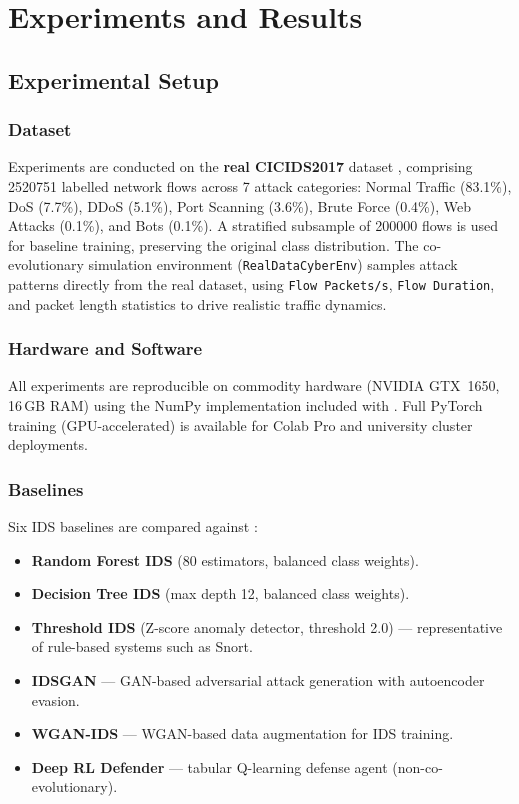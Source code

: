 \chapter{Experiments and Results}
\label{ch:experiments}

\section{Experimental Setup}

\subsection{Dataset}
Experiments are conducted on the \textbf{real CICIDS2017} dataset
\citep{sharafaldin2018}, comprising \num{2520751} labelled network flows
across 7 attack categories: Normal Traffic (83.1\%), DoS (7.7\%),
DDoS (5.1\%), Port Scanning (3.6\%), Brute Force (0.4\%),
Web Attacks (0.1\%), and Bots (0.1\%).
A stratified subsample of \num{200000} flows is used for baseline
training, preserving the original class distribution.
The co-evolutionary simulation environment (\texttt{RealDataCyberEnv})
samples attack patterns directly from the real dataset, using
\texttt{Flow Packets/s}, \texttt{Flow Duration}, and packet length
statistics to drive realistic traffic dynamics.

\subsection{Hardware and Software}
All experiments are reproducible on commodity hardware
(NVIDIA GTX~1650, 16\,GB RAM) using the NumPy implementation
included with \caesar{}.
Full PyTorch training (GPU-accelerated) is available for Colab Pro
and university cluster deployments.

\subsection{Baselines}
Six IDS baselines are compared against \caesar{}:
\begin{itemize}
  \item \textbf{Random Forest IDS} (80 estimators, balanced class weights).
  \item \textbf{Decision Tree IDS} (max depth 12, balanced class weights).
  \item \textbf{Threshold IDS} (Z-score anomaly detector, threshold 2.0) ---
    representative of rule-based systems such as Snort.
  \item \textbf{IDSGAN} \citep{lin2018} --- GAN-based adversarial attack
    generation with autoencoder evasion.
  \item \textbf{WGAN-IDS} \citep{ring2019} --- WGAN-based data augmentation
    for IDS training.
  \item \textbf{Deep RL Defender} \citep{nguyen2021} --- tabular Q-learning
    defense agent (non-co-evolutionary).
\end{itemize}

